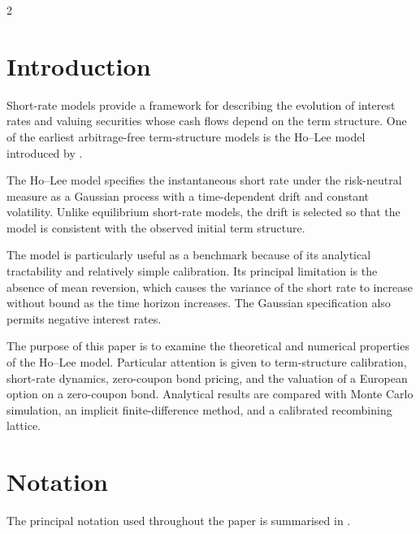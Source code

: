 \documentclass[10pt,a4paper]{article}
\numberwithin{equation}{section}
\begin{document}
\begin{multicols}{2}

\section{Introduction}

Short-rate models provide a framework for describing the evolution of
interest rates and valuing securities whose cash flows depend on the term
structure. One of the earliest arbitrage-free term-structure models is
the Ho--Lee model introduced by \citet{HoLee1986}.

The Ho--Lee model specifies the instantaneous short rate under the
risk-neutral measure as a Gaussian process with a time-dependent drift
and constant volatility. Unlike equilibrium short-rate models, the drift
is selected so that the model is consistent with the observed initial
term structure.

The model is particularly useful as a benchmark because of its analytical
tractability and relatively simple calibration. Its principal limitation
is the absence of mean reversion, which causes the variance of the short
rate to increase without bound as the time horizon increases. The
Gaussian specification also permits negative interest rates.

The purpose of this paper is to examine the theoretical and numerical
properties of the Ho--Lee model. Particular attention is given to
term-structure calibration, short-rate dynamics, zero-coupon bond pricing,
and the valuation of a European option on a zero-coupon bond. Analytical
results are compared with Monte Carlo simulation, an implicit
finite-difference method, and a calibrated recombining lattice.

\section{Notation}

The principal notation used throughout the paper is summarised in
.

\begin{table}[H]
    \centering


\end{table}
\end{multicols}
\end{document}
